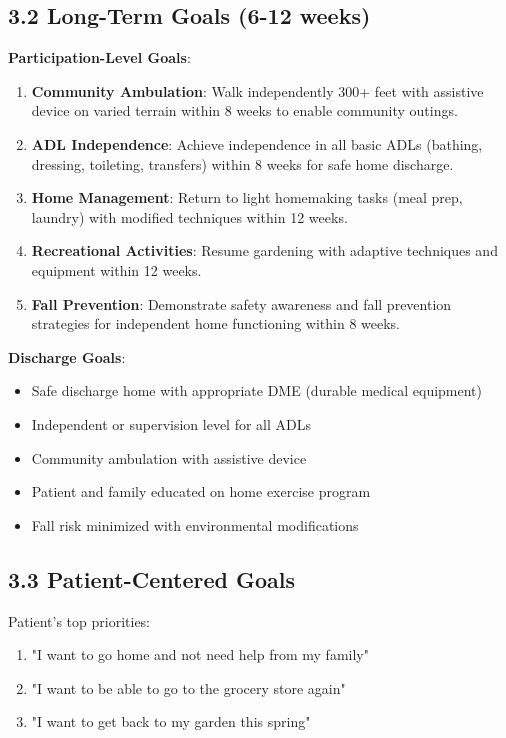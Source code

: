 \documentclass[11pt,letterpaper]{article}
\begin{document}
\subsection*{3.2 Long-Term Goals (6-12 weeks)}

\textbf{Participation-Level Goals}:
\begin{enumerate}[leftmargin=*]
    \item \textbf{Community Ambulation}: Walk independently 300+ feet with assistive device on varied terrain within 8 weeks to enable community outings.

    \item \textbf{ADL Independence}: Achieve independence in all basic ADLs (bathing, dressing, toileting, transfers) within 8 weeks for safe home discharge.

    \item \textbf{Home Management}: Return to light homemaking tasks (meal prep, laundry) with modified techniques within 12 weeks.

    \item \textbf{Recreational Activities}: Resume gardening with adaptive techniques and equipment within 12 weeks.

    \item \textbf{Fall Prevention}: Demonstrate safety awareness and fall prevention strategies for independent home functioning within 8 weeks.
\end{enumerate}

\textbf{Discharge Goals}:
\begin{itemize}[leftmargin=*]
    \item Safe discharge home with appropriate DME (durable medical equipment)
    \item Independent or supervision level for all ADLs
    \item Community ambulation with assistive device
    \item Patient and family educated on home exercise program
    \item Fall risk minimized with environmental modifications
\end{itemize}

\subsection*{3.3 Patient-Centered Goals}

Patient's top priorities:
\begin{enumerate}[leftmargin=*]
    \item "I want to go home and not need help from my family"
    \item "I want to be able to go to the grocery store again"
    \item "I want to get back to my garden this spring"
\end{enumerate}
\end{document}
